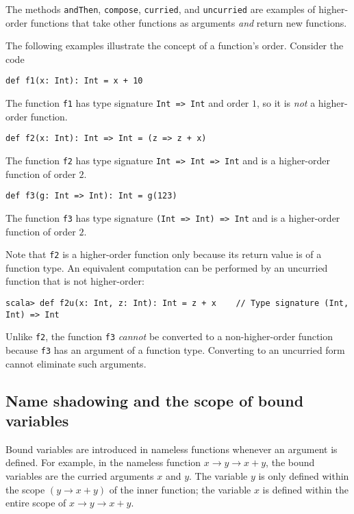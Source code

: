 The methods \lstinline!andThen!, \lstinline!compose!, \lstinline!curried!,
and \lstinline!uncurried! are examples of higher-order functions
that take other functions as arguments \emph{and} return new functions.

The following examples illustrate the concept of a function\textsf{'}s order.
Consider the code
\begin{lstlisting}
def f1(x: Int): Int = x + 10
\end{lstlisting}
The function \texttt{}\lstinline!f1! has type signature \texttt{}\lstinline!Int => Int!
and order $1$, so it is \emph{not} a higher-order function.
\begin{lstlisting}
def f2(x: Int): Int => Int = (z => z + x)
\end{lstlisting}
The function \texttt{}\lstinline!f2! has type signature \texttt{}\lstinline!Int => Int => Int!
and is a higher-order function of order $2$. 
\begin{lstlisting}
def f3(g: Int => Int): Int = g(123)
\end{lstlisting}
The function \texttt{}\lstinline!f3! has type signature \texttt{}\lstinline!(Int => Int) => Int!
and is a higher-order function of order $2$.

Note that \texttt{}\lstinline!f2! is a higher-order function only
because its return value is of a function type. An equivalent computation
can be performed by an uncurried function that is not higher-order:
\begin{lstlisting}
scala> def f2u(x: Int, z: Int): Int = z + x    // Type signature (Int, Int) => Int
\end{lstlisting}
Unlike \lstinline!f2!, the function \lstinline!f3! \emph{cannot}
be converted to a non-higher-order function because \lstinline!f3!
has an argument of a function type. Converting to an uncurried form
cannot eliminate such arguments.

\subsection{Name shadowing and the scope of bound variables}

Bound variables are introduced in nameless functions whenever an argument
is defined. For example, in the nameless function $x\rightarrow y\rightarrow x+y$,
the bound variables are the curried arguments $x$ and $y$. The variable
$y$ is only defined within the scope $\left(y\rightarrow x+y\right)$
of the inner function; the variable $x$ is defined within the entire
scope of $x\rightarrow y\rightarrow x+y$.

